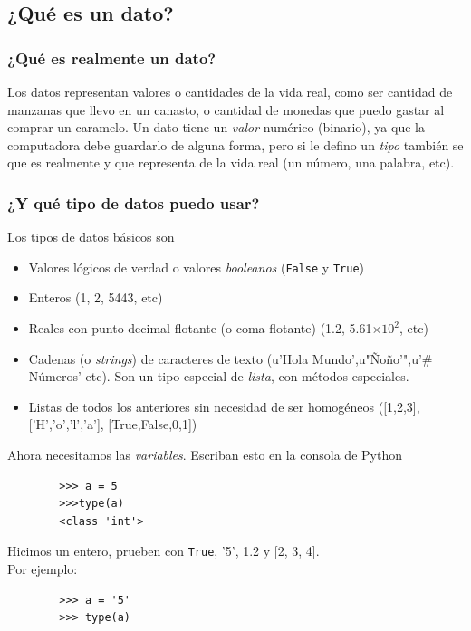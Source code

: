 \documentclass{beamer}
\begin{document}
\subsection{¿Qué es un dato?}
\begin{frame}
    \frametitle{¿Qué es realmente un dato?}
    Los datos representan valores o cantidades de la vida real, como ser cantidad de manzanas que llevo en un canasto, o cantidad de monedas que puedo gastar al comprar un caramelo.
    \vskip11pt
    Un dato tiene un \emph{valor} numérico (binario), ya que la computadora debe guardarlo de alguna forma, pero si le defino un \emph{tipo} también se que es realmente y que representa de la vida real (un número, una palabra, etc).

\end{frame}

\begin{frame}
    \frametitle{¿Y qué tipo de datos puedo usar?}
    Los tipos de datos básicos son
    \begin{itemize}[<+->]
    \item Valores lógicos de verdad o valores \emph{booleanos} (\texttt{False} y \texttt{True})
    \item Enteros (1, 2, 5443, etc)
    \item Reales con punto decimal flotante (o coma flotante) (1.2, 5.61$\times 10^2$, etc)
    \item Cadenas (o \emph{strings}) de caracteres de texto (u'Hola Mundo',u"Ñoño'",u'\# Números' etc). Son un tipo especial de \emph{lista}, con métodos especiales.
    \item Listas de todos los anteriores sin necesidad de ser homogéneos ([1,2,3], ['H','o','l','a'], [True,False,0,1])
    \end{itemize}
\end{frame}

\begin{frame}[fragile]
    Ahora necesitamos las \emph{variables}. Escriban esto en la consola de Python
    \begin{verbatim}
        >>> a = 5
        >>>type(a)
        <class 'int'>
    \end{verbatim}
    Hicimos un entero, prueben con \texttt{True}, '5', 1.2 y [2, 3, 4]. \\Por ejemplo:
    \begin{verbatim}
        >>> a = '5'
        >>> type(a)
    \end{verbatim}
\end{frame}
\end{document}
